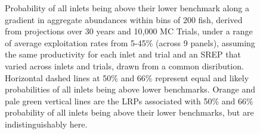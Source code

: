 \documentclass[11pt]{book}
\begin{document}
\begin{figure}[htb]

{\centering {} 

}

\caption{Probability of all inlets being above their lower benchmark along a gradient in aggregate abundances within bins of 200 fish, derived from projections over 30 years and 10,000 MC Trials, under a range of average exploitation rates from 5-45\% (across 9 panels), assuming the same productivity for each inlet and trial and an SREP that varied across inlets and trials, drawn from a common disribution. Horizontal dashed lines at 50\% and 66\% represent equal and likely probabilities of all inlets being above lower benchmarks. Orange and pale green vertical lines are the LRPs associated with 50\% and 66\% probability of all inlets being above their lower benchmarks, but are indistinguishably here. }\label{fig:chinook-ProjLRPs-SameProd}
\end{figure}
\linebreak
\end{document}
